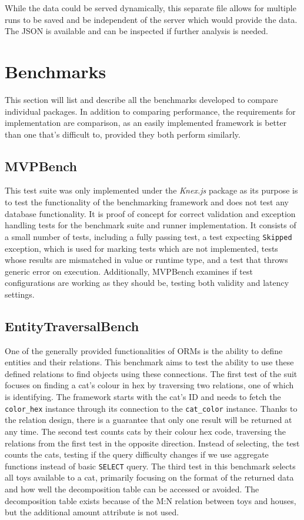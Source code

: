 While the data could be served dynamically, this separate file allows for
multiple runs to be saved and be independent of the server which would provide
the data. The JSON is available and can be inspected if further analysis is
needed.

\section{Benchmarks}
This section will list and describe all the benchmarks developed to compare
individual packages. In addition to comparing performance, the requirements for
implementation are comparison, as an easily implemented framework is better than
one that's difficult to, provided they both perform similarly.

\subsection{MVPBench}
This test suite was only implemented under the \textit{Knex.js} package as its
purpose is to test the functionality of the benchmarking framework and does not
test any database functionality. It is proof of concept for correct validation
and exception handling tests for the benchmark suite and runner implementation.
It consists of a small number of tests, including a fully passing test, a test
expecting \texttt{Skipped} exception, which is used for marking tests which are
not implemented, tests whose results are mismatched in value or runtime type,
and a test that throws generic error on execution. Additionally, MVPBench
examines if test configurations are working as they should be, testing both
validity and latency settings.

\subsection{EntityTraversalBench}
One of the generally provided functionalities of ORMs is the ability to define
entities and their relations. This benchmark aims to test the ability to use
these defined relations to find objects using these connections. The first test
of the suit focuses on finding a cat's colour in hex by traversing two
relations, one of which is identifying. The framework starts with the cat's ID
and needs to fetch the \texttt{color\_hex} instance through its connection to the
\texttt{cat\_color} instance. Thanks to the relation design, there is a guarantee
that only one result will be returned at any time. The second test counts cats
by their colour hex code, traversing the relations from the first test in the
opposite direction. Instead of selecting, the test counts the cats, testing if
the query difficulty changes if we use aggregate functions instead of basic
\texttt{SELECT} query. The third test in this benchmark selects all toys
available to a cat, primarily focusing on the format of the returned data and
how well the decomposition table can be accessed or avoided. The decomposition
table exists because of the M:N relation between toys and houses, but the
additional amount attribute is not used.